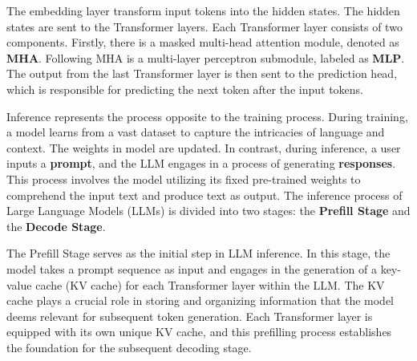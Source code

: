 
The embedding layer transform input tokens into the hidden states. 
The hidden states are sent to the Transformer layers.
Each Transformer layer consists of two components. 
Firstly, there is a masked multi-head attention module, denoted as \textbf{MHA}. 
Following MHA is a multi-layer perceptron submodule, labeled as \textbf{MLP}. 
The output from the last Transformer layer is then sent to the prediction head, which is responsible for predicting the next token after the input tokens.

Inference represents the process opposite to the training process. During training, a model learns from a vast dataset to capture the intricacies of language and context. The weights in model are updated. In contrast, during inference, a user inputs a \textbf{prompt}, and the LLM engages in a process of generating \textbf{responses}.
This process involves the model utilizing its fixed pre-trained weights to comprehend the input text and produce text as output. 
The inference process of Large Language Models (LLMs) is divided into two stages: the \textbf{Prefill Stage} and the \textbf{Decode Stage}.


The Prefill Stage serves as the initial step in LLM inference. In this stage, the model takes a prompt sequence as input and engages in the generation of a key-value cache (KV cache) for each Transformer layer within the LLM. The KV cache plays a crucial role in storing and organizing information that the model deems relevant for subsequent token generation. Each Transformer layer is equipped with its own unique KV cache, and this prefilling process establishes the foundation for the subsequent decoding stage.

